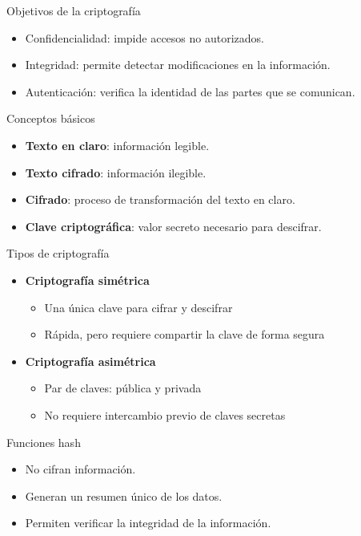 \documentclass{beamer}
\begin{document}
\begin{frame}{Objetivos de la criptografía}
\begin{itemize}
  \item Confidencialidad: impide accesos no autorizados.
  \item Integridad: permite detectar modificaciones en la información.
  \item Autenticación: verifica la identidad de las partes que se comunican.
\end{itemize}
\end{frame}

\begin{frame}{Conceptos básicos}
\begin{itemize}
  \item \textbf{Texto en claro}: información legible.
  \item \textbf{Texto cifrado}: información ilegible.
  \item \textbf{Cifrado}: proceso de transformación del texto en claro.
  \item \textbf{Clave criptográfica}: valor secreto necesario para descifrar.
\end{itemize}
\end{frame}

\begin{frame}{Tipos de criptografía}
\begin{itemize}
  \item \textbf{Criptografía simétrica}
  \begin{itemize}
    \item Una única clave para cifrar y descifrar
    \item Rápida, pero requiere compartir la clave de forma segura
  \end{itemize}
  \item \textbf{Criptografía asimétrica}
  \begin{itemize}
    \item Par de claves: pública y privada
    \item No requiere intercambio previo de claves secretas
  \end{itemize}
\end{itemize}
\end{frame}

\begin{frame}{Funciones hash}
\begin{itemize}
  \item No cifran información.
  \item Generan un resumen único de los datos.
  \item Permiten verificar la integridad de la información.
\end{itemize}
\end{frame}
\end{document}
